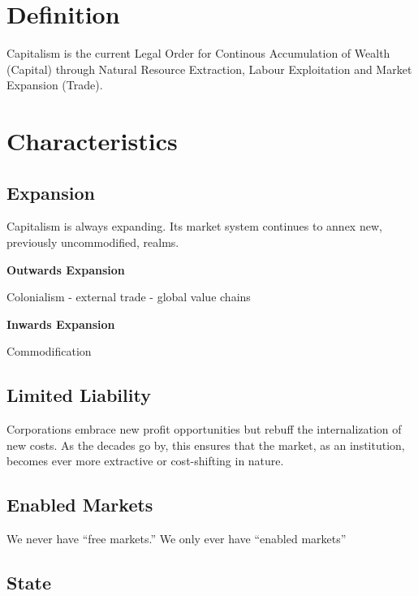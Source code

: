 \documentclass[
]{book}
\begin{document}
\hypertarget{definition}{%
\section{Definition}\label{definition}}

Capitalism is the current Legal Order for Continous Accumulation of Wealth (Capital)
through Natural Resource Extraction, Labour Exploitation and Market Expansion (Trade).

\hypertarget{characteristics}{%
\section{Characteristics}\label{characteristics}}

\hypertarget{expansion}{%
\subsection{Expansion}\label{expansion}}

Capitalism is always expanding.
Its market system continues to annex new, previously uncommodified, realms.

\textbf{Outwards Expansion}

Colonialism - external trade - global value chains

\textbf{Inwards Expansion}

Commodification

\hypertarget{limited-liability}{%
\subsection{Limited Liability}\label{limited-liability}}

Corporations embrace new profit opportunities but rebuff the internalization of new costs.
As the decades go by, this ensures that the market, as an institution,
becomes ever more extractive or cost-shifting in nature.

\hypertarget{enabled-markets}{%
\subsection{Enabled Markets}\label{enabled-markets}}

We never have ``free markets.''
We only ever have ``enabled markets''

\hypertarget{state}{%
\subsection{State}\label{state}}
\end{document}
